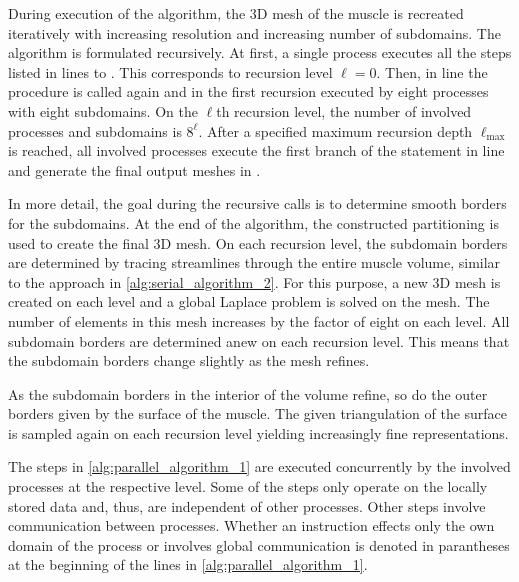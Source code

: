 During execution of the algorithm, the 3D mesh of the muscle is recreated iteratively with increasing resolution and increasing number of subdomains. The algorithm is formulated recursively. At first, a single process executes all the steps listed in lines  to . This corresponds to recursion level $\ell=0$. Then, in line  the procedure is called again and in the first recursion executed by eight processes with eight subdomains. On the $\ell$th recursion level, the number of involved processes and subdomains is $8^\ell$. After a specified maximum recursion depth $\ell_\text{max}$ is reached, all involved processes execute the first branch of the  statement in line  and generate the final output meshes in .

In more detail, the goal during the recursive calls is to determine smooth borders for the subdomains. At the end of the algorithm, the constructed partitioning is used to create the final 3D mesh. On each recursion level, the subdomain borders are determined by tracing streamlines through the entire muscle volume, similar to the approach in \cref{alg:serial_algorithm_2}. For this purpose, a new 3D mesh is created on each level and a global Laplace problem is solved on the mesh. The number of elements in this mesh increases by the factor of eight on each level. All subdomain borders are determined anew on each recursion level. This means that the subdomain borders change slightly as the mesh refines.

As the subdomain borders in the interior of the volume refine, so do the outer borders given by the surface of the muscle. The given triangulation of the surface is sampled again on each recursion level yielding increasingly fine representations.

The steps in \cref{alg:parallel_algorithm_1} are executed concurrently by the involved processes at the respective level.
Some of the steps only operate on the locally stored data and, thus, are independent of other processes. Other steps involve communication between processes. Whether an instruction effects only the own domain of the process or involves global communication is denoted in parantheses at the beginning of the lines in \cref{alg:parallel_algorithm_1}.

